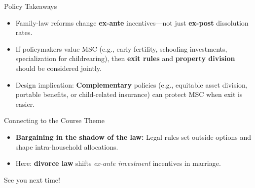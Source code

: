 \documentclass[11pt,notes=hide,aspectratio=169,mathserif]{beamer}
\begin{document}
\begin{frame}{Policy Takeaways}
\small
\begin{itemize}
  \item Family-law reforms change \textbf{ex-ante} incentives—not just \textbf{ex-post} dissolution rates.
  \item If policymakers value MSC (e.g., early fertility, schooling investments, specialization for childrearing), then \textbf{exit rules} and \textbf{property division} should be considered jointly.
  \item Design implication: \textbf{Complementary} policies (e.g., equitable asset division, portable benefits, or child-related insurance) can protect MSC when exit is easier.
\end{itemize}
\end{frame}

\begin{frame}{Connecting to the Course Theme}
\small
\begin{itemize}
  \item \textbf{Bargaining in the shadow of the law:} Legal rules set outside options and shape intra-household allocations.
  \item Here: \textbf{divorce law} shifts \emph{ex-ante investment} incentives in marriage.
\end{itemize}
\end{frame}




\begin{frame}
\begin{center}{\LARGE See you next time!}\end{center}
\end{frame}
\end{document}
